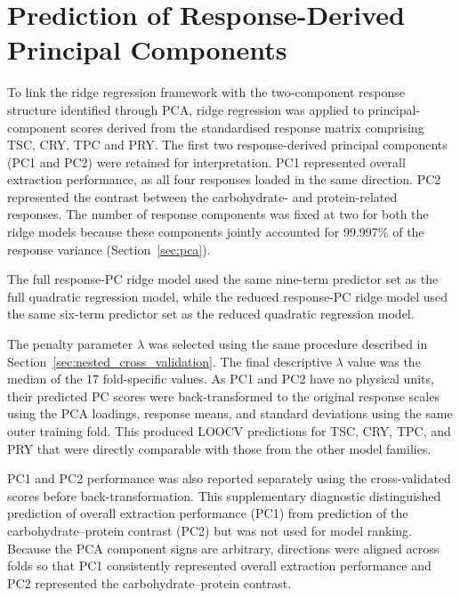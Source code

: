 \documentclass[MScDSA]{uccthesis}
\begin{document}
\section{Prediction of Response-Derived Principal Components}
\label{sec:response_derived_pc}
To link the ridge regression framework with the two-component response structure identified through PCA, ridge regression was applied to principal-component scores derived from the standardised response matrix comprising TSC, CRY, TPC and PRY. The first two response-derived principal components (PC1 and PC2) were retained for interpretation. PC1 represented overall extraction performance, as all four responses loaded in the same direction. PC2 represented the contrast between the carbohydrate- and protein-related responses. The number of response components was fixed at two for both the ridge models because these components jointly accounted for 99.997\% of the response variance (Section~\ref{sec:pca}).

The full response-PC ridge model used the same nine-term predictor set as the full quadratic regression model, while the reduced response-PC ridge model used the same six-term predictor set as the reduced quadratic regression model.

The penalty parameter $\lambda$ was selected using the same procedure described in Section~\ref{sec:nested_cross_validation}. The final descriptive $\lambda$ value was the median of the 17 fold-specific values. As PC1 and PC2 have no physical units, their predicted PC scores were back-transformed to the original response scales using the PCA loadings, response means, and standard deviations using the same outer training fold. This produced LOOCV predictions for TSC, CRY, TPC, and PRY that were directly comparable with those from the other model families.

PC1 and PC2 performance was also reported separately using the cross-validated scores before back-transformation. This supplementary diagnostic distinguished prediction of overall extraction performance (PC1) from prediction of the carbohydrate--protein contrast (PC2) but was not used for model ranking. Because the PCA component signs are arbitrary, directions were aligned across folds so that PC1 consistently represented overall extraction performance and PC2 represented the carbohydrate--protein contrast.
\end{document}
